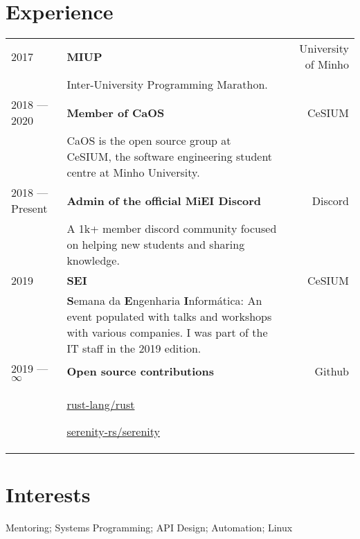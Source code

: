 \documentclass{article}
\begin{document}
\begin{textblock}{9.4}
    \section{Experience}
    \begin{tabular}{lp{8.4cm}r}
        2017 & \textbf{MIUP} & University of Minho\\
        & Inter-University Programming Marathon. &\\
        2018 --- 2020 & \textbf{Member of CaOS} & CeSIUM\\
        & CaOS is the open source group at CeSIUM, the software engineering
        student centre at Minho University. &\\
        2018 --- Present & \textbf{Admin of the official MiEI Discord} & Discord\\
        & A 1k+ member discord community focused on helping new students and sharing
        knowledge. &\\
        2019 & \textbf{SEI} & CeSIUM \\
        & \textbf{S}emana da \textbf{E}ngenharia \textbf{I}nformática: An event
        populated with talks and workshops with various companies. I was part of
        the IT staff in the 2019 edition. &\\
        2019 --- $\infty$ & \textbf{Open source contributions} & Github\\
        & \href{https://github.com/rust-lang/rust/pulls?q=author\%3Amendess+}
                {rust-lang/rust}

          \href{https://github.com/serenity-rs/serenity/pulls?q=author\%3Amendess+}
                {serenity-rs/serenity} &
    \end{tabular}

    \section{Interests}
    Mentoring\@; Systems Programming\@; API Design\@; Automation\@; Linux

\end{textblock}
\end{document}
